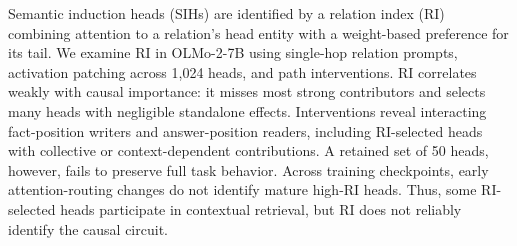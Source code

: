 Semantic induction heads (SIHs) are identified by a relation index (RI) combining attention to a relation’s head entity with a weight-based preference for its tail.
We examine RI in OLMo-2-7B using single-hop relation prompts, activation patching across 1,024 heads, and path interventions. 
RI correlates weakly with causal importance: it misses most strong contributors and selects many heads with negligible standalone effects.
Interventions reveal interacting fact-position writers and answer-position readers, including RI-selected heads with collective or context-dependent contributions. 
A retained set of 50 heads, however, fails to preserve full task behavior.
Across training checkpoints, early attention-routing changes do not identify mature high-RI heads. 
Thus, some RI-selected heads participate in contextual retrieval, but RI does not reliably identify the causal circuit.